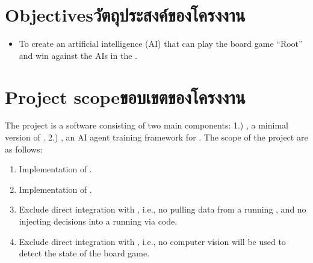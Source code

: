 


\section{\ifenglish Objectives\else วัตถุประสงค์ของโครงงาน\fi}
\begin{itemize}
    \item To create an artificial intelligence (AI) that can play the board game ``Root'' and win against the AIs in the \RootV{}.
\end{itemize}

\section{\ifenglish Project scope\else ขอบเขตของโครงงาน\fi}
The project is a software consisting of two main components: 1.) \textit{\RootOurs{}}, a minimal version of \RootV{}. 2.) \textit{\RootAI{}}, an AI agent training framework for \RootOurs{}. The scope of the project are as follows:
\begin{enumerate}
    \item Implementation of \RootOurs{}.
    \item Implementation of \RootAI{}.
    \item Exclude direct integration with \RootV{}, i.e., no pulling data from a running \RootV{}, and no injecting decisions into a running \RootV{} via code.
    \item Exclude direct integration with \RootB{}, i.e., no computer vision will be used to detect the state of the board game.
\end{enumerate}

